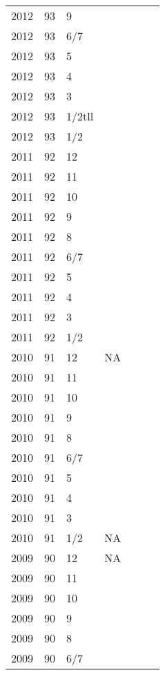 \begin{longtable}{ |l|l|l|l|p{2.7cm}|l|p{2cm}| }
 2012 & 93 & 9     &         &  &  & \\
 2012 & 93 &   6/7 &         &  &  & \\
 2012 & 93 &     5 &         &  &  & \\
 2012 & 93 &     4 &         &  &  & \\
 2012 & 93 &     3 &         &  &  & \\
 2012 & 93 & 1/2tll&         &  &  & \\
 2012 & 93 &   1/2 &         &  &  & \\
 2011 & 92 &    12 &         &  &  & \\
 2011 & 92 &    11 &         &  &  & \\
 2011 & 92 &    10 &         &  &  & \\
 2011 & 92 &     9 &         &  &  & \\
 2011 & 92 &     8 &         &  &  & \\
 2011 & 92 &   6/7 &         &  &  & \\
 2011 & 92 &     5 &         &  &  & \\
 2011 & 92 &     4 &         &  &  & \\
 2011 & 92 &     3 &         &  &  & \\
 2011 & 92 &   1/2 &         &  &  & \\
 2010 & 91 &   12  &      NA &  &  & \\
 2010 & 91 &    11 &         &  &  & \\
 2010 & 91 &    10 &         &  &  & \\
 2010 & 91 &     9 &         &  &  & \\
 2010 & 91 &     8 &         &  &  & \\
 2010 & 91 &   6/7 &         &  &  & \\
 2010 & 91 &     5 &         &  &  & \\
 2010 & 91 &     4 &         &  &  & \\
 2010 & 91 &     3 &         &  &  & \\
 2010 & 91 &   1/2 &      NA &  &  & \\
 2009 & 90 &    12 &      NA &  &  & \\
 2009 & 90 &    11 &         &  &  & \\
 2009 & 90 &    10 &         &  &  & \\
 2009 & 90 &     9 &         &  &  & \\
 2009 & 90 &     8 &         &  &  & \\
 2009 & 90 &   6/7 &         &  &  & \\

\end{longtable}
